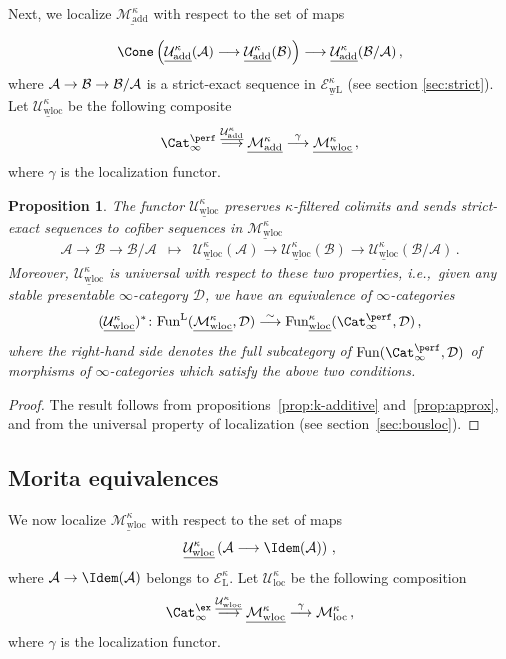 \documentclass{amsart}
\renewcommand{\to}{\mathchoice{\longrightarrow}{\rightarrow}{\rightarrow}{\rightarrow}}
\newcommand{\cA}{{\mathcal A}}
\newcommand{\cB}{{\mathcal B}}
\newcommand{\cD}{{\mathcal D}}
\newcommand{\cE}{{\mathcal E}}
\newcommand{\cM}{{\mathcal M}}
\newcommand{\cU}{{\mathcal U}}
\renewcommand{\L}{\mathrm{L}}
\newcommand{\stabcat}{\Cat_\i^{\ex}}
\newcommand{\idemstabcat}{\Cat_\i^{\perf}}
\newcommand{\Fun}{\mathrm{Fun}} %
\newcommand{\ie}{{i.e.,}\ }
\newcommand{\too}{\longrightarrow}%
\renewcommand{\i}{\infty}
\newcommand{\uMotadd}{\underline{\cM_{\mathrm{add}}^\kappa}}
\newcommand{\uwMotloc}{\underline{\cM_{\mathrm{wloc}}^\kappa}}
\newcommand{\wMotloc}{\cM_{\mathrm{loc}}^\kappa}
\newcommand{\uUmot}{\underline{\cU_{\mathrm{add}}^\kappa}}
\newcommand{\uwUloc}{\underline{\cU_{\mathrm{wloc}}^\kappa}}
\newcommand{\wUloc}{\cU_{\mathrm{loc}}^\kappa}
\numberwithin{equation}{section}
\newtheorem{proposition}[equation]{Proposition}
\theoremstyle{definition}
\begin{document}
Next, we localize $\uMotadd$ with respect to the set of maps

\begin{equation}\label{eq:maps1}
\Cone\left(\uUmot(\cA) \too \uUmot(\cB)\right) \too \uUmot(\cB/\cA)\,,
\end{equation}
where $\cA \to \cB \to \cB/\cA$ is a strict-exact sequence in
$\underline{\cE_\mathrm{wL}^\kappa}$ (see section \ref{sec:strict}). Let $\uwUloc$ be the following
composite
$$ \idemstabcat \stackrel{\uUmot}{\too} \uMotadd \stackrel{\gamma}{\too} \uwMotloc\,,$$
where $\gamma$ is the localization functor.

\begin{proposition}\label{prop:k-Waldhausen}
The functor $\uwUloc$ preserves $\kappa$-filtered colimits and
sends strict-exact sequences to cofiber sequences in $\uwMotloc$
\begin{eqnarray*}
\cA \too \cB \too \cB/\cA & \mapsto
& \uwUloc(\cA) \too \uwUloc(\cB) \too \uwUloc(\cB/\cA)\,.
\end{eqnarray*}
Moreover, $\uwUloc$ is universal with respect to these two
properties, \ie given any stable presentable $\i$-category $\cD$, we
have an equivalence of $\i$-categories
$$ (\uwUloc)^{\ast}\colon \Fun^{\L}(\uwMotloc, \cD) \stackrel{\sim}{\too} \Fun_{\underline{\mathrm{wloc}}}^\kappa(\idemstabcat, \cD)\,,$$
where the right-hand side denotes the full subcategory of
$\Fun(\idemstabcat, \cD)$ of morphisms of $\i$-categories which satisfy
the above two conditions.
\end{proposition}

\begin{proof}
The result follows from propositions~\ref{prop:k-additive}
and~\ref{prop:approx}, and from the universal property of localization
(see section~\ref{sec:bousloc}).
\end{proof}

\subsection{Morita equivalences}
We now localize $\uwMotloc$ with respect to the set of maps
\[
\uwUloc \left( \cA \too \Idem(\cA)\right)\,,
\]
where $\cA \to \Idem(\cA)$ belongs to $\cE^\kappa_\mathrm{L}$.
Let $\wUloc$ be the following
composition
\[
\stabcat \stackrel{\uwUloc}{\too} \uwMotloc \stackrel{\gamma}{\to} \wMotloc\,,
\]
where $\gamma$ is the localization functor.
\end{document}
